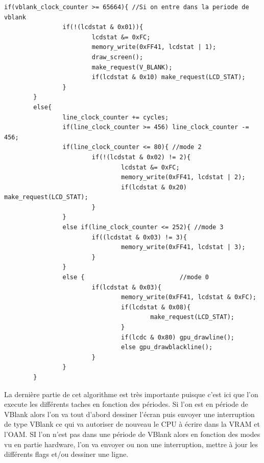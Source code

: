 \documentclass{report}
\begin{document}
\begin{lstlisting}
if(vblank_clock_counter >= 65664){ //Si on entre dans la periode de vblank
                if(!(lcdstat & 0x01)){
                        lcdstat &= 0xFC;
                        memory_write(0xFF41, lcdstat | 1);
                        draw_screen();
                        make_request(V_BLANK);
                        if(lcdstat & 0x10) make_request(LCD_STAT);
                }
        }
        else{
                line_clock_counter += cycles;
                if(line_clock_counter >= 456) line_clock_counter -= 456;
                if(line_clock_counter <= 80){ //mode 2
                        if(!(lcdstat & 0x02) != 2){
                                lcdstat &= 0xFC;
                                memory_write(0xFF41, lcdstat | 2);
                                if(lcdstat & 0x20) make_request(LCD_STAT);
                        }
                }
                else if(line_clock_counter <= 252){ //mode 3
                        if((lcdstat & 0x03) != 3){
                                memory_write(0xFF41, lcdstat | 3);
                        }
                }
                else {                          //mode 0 
                        if(lcdstat & 0x03){
                                memory_write(0xFF41, lcdstat & 0xFC);
                                if(lcdstat & 0x08){
                                        make_request(LCD_STAT);
                                }
                                if(lcdc & 0x80) gpu_drawline();
                                else gpu_drawblackline();
                        }
                }
        }

\end{lstlisting}
La dernière partie de cet algorithme est très importante puisque c'est ici que l'on execute les différents taches en fonction des périodes. Si l'on est en période de VBlank alors l'on va tout d'abord dessiner l'écran puis envoyer une interruption de type VBlank ce qui va autoriser de nouveau le CPU à écrire dans la VRAM et l'OAM. SI l'on n'est pas dans une période de VBlank alors en fonction des modes vu en partie hardware, l'on va envoyer ou non une interruption, mettre à jour les différents flags et/ou dessiner une ligne.\\
\end{document}
